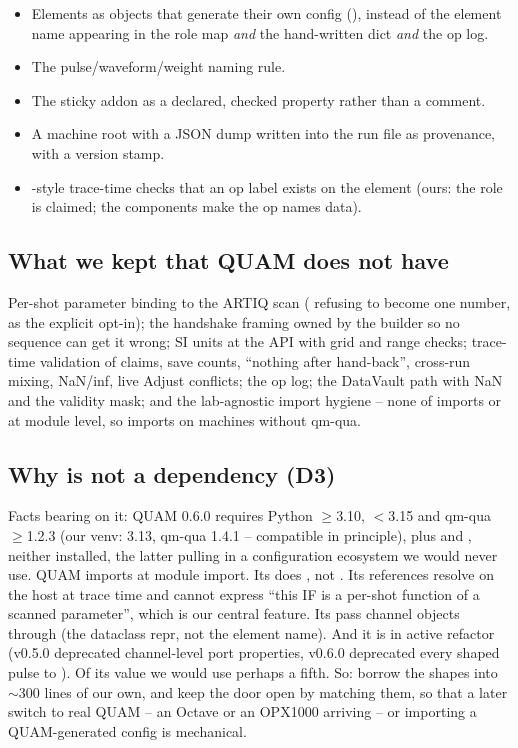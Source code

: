 \begin{itemize}[nosep]
  \item Elements as objects that generate their own config
    (), instead of the element name appearing in the
    role map \emph{and} the hand-written dict \emph{and} the op log.
  \item The pulse/waveform/weight naming rule.
  \item The sticky addon as a declared, checked property rather than a
    comment.
  \item A machine root with a JSON dump written into the run file as
    provenance, with a version stamp.
  \item {}-style trace-time checks that an op label exists on the
    element (ours: the role is claimed; the components make the op names
    data).
\end{itemize}

\subsection{What we kept that QUAM does not have}

Per-shot parameter binding to the ARTIQ scan ( refusing to
become one number,  as the explicit opt-in); the handshake
framing owned by the builder so no sequence can get it wrong; SI units at the
API with grid and range checks; trace-time validation of claims, save counts,
``nothing after hand-back'', cross-run  mixing, NaN/inf, live
Adjust conflicts; the op log; the DataVault path with NaN and the validity
mask; and the lab-agnostic import hygiene -- none of
 imports
 or  at module level, so  imports on machines
without qm-qua.

\subsection{Why  is not a dependency (D3)}

Facts bearing on it: QUAM 0.6.0 requires Python $\ge$3.10, $<$3.15 and
qm-qua $\ge$1.2.3 (our venv: 3.13, qm-qua 1.4.1 -- compatible in principle),
plus  and , neither installed, the
latter pulling in a configuration ecosystem we would never use. QUAM imports
 at module import. Its  does , not
. Its references resolve on the host at trace time and
cannot express ``this IF is a per-shot function of a scanned parameter'',
which is our central feature. Its  pass channel
objects through  (the dataclass repr, not the element name). And
it is in active refactor (v0.5.0 deprecated channel-level port properties,
v0.6.0 deprecated every shaped pulse to ). Of its value we
would use perhaps a fifth. So: borrow the shapes into $\sim$300 lines of our
own, and keep the door open by matching them, so that a later switch to real
QUAM -- an Octave or an OPX1000 arriving -- or importing a QUAM-generated
config is mechanical.
